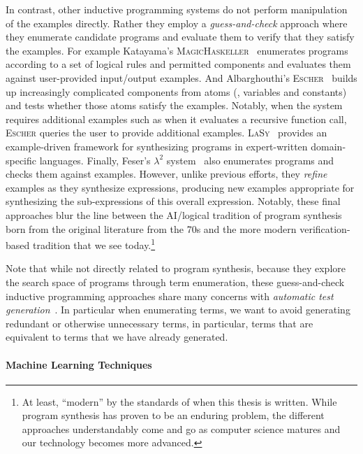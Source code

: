 In contrast, other inductive programming systems do not perform manipulation of the examples directly.
Rather they employ a \emph{guess-and-check} approach where they enumerate candidate programs and evaluate them to verify that they satisfy the examples.
For example Katayama's \textsc{MagicHaskeller}~\citep{katayama-pepm-2012} enumerates programs according to a set of
logical rules and permitted components and evaluates them against user-provided input/output examples.
And Albarghouthi's \textsc{Escher}~\citep{albarghouthi-cav-2013} builds up increasingly complicated components from atoms (\ie, variables and constants) and tests whether those atoms satisfy the examples.
Notably, when the system requires additional examples such as when it evaluates a recursive function call, \textsc{Escher} queries the user to provide additional examples.
\textsc{LaSy}~\citep{perelman-pldi-2014} provides an example-driven framework for synthesizing programs in expert-written domain-specific languages.
Finally, Feser's $λ^2$ system~\citep{feser-pldi-2015} also enumerates programs and checks them against examples.
However, unlike previous efforts, they \emph{refine} examples as they synthesize expressions, producing new examples appropriate for synthesizing the sub-expressions of this overall expression.
Notably, these final approaches blur the line between the AI/logical tradition of program synthesis born from the original literature from the 70s and the more modern verification-based tradition that we see today.\footnote{%
  At least, ``modern'' by the standards of when this thesis is written.
  While program synthesis has proven to be an enduring problem, the different approaches understandably come and go as computer science matures and our technology becomes more advanced.
}

Note that while not directly related to program synthesis, because they explore the search space of programs through term enumeration, these guess-and-check inductive programming approaches share many concerns with \emph{automatic test generation}~\citep{claessen-flp-2014, grygiel-jfp-2013, yakushev-aaip-2010}.
In particular when enumerating terms, we want to avoid generating redundant or otherwise unnecessary terms, in particular, terms that are equivalent to terms that we have already generated.

\paragraph{Machine Learning Techniques}

